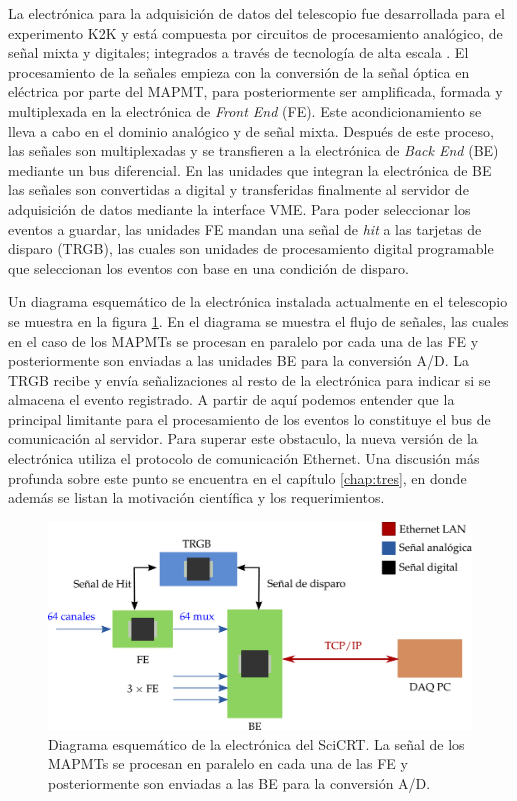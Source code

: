 La electrónica para la adquisición de datos del telescopio fue desarrollada para el experimento K2K y está compuesta por circuitos de procesamiento analógico, de señal mixta y digitales; integrados a través de tecnología de alta escala \cite{myoshi04}. El procesamiento de la señales empieza con la conversión de la señal óptica en eléctrica por parte del MAPMT, para posteriormente ser amplificada, formada y multiplexada en la electrónica de \emph{Front End} (FE). Este acondicionamiento se lleva a cabo en el dominio analógico y de señal mixta. Después de este proceso, las señales son multiplexadas y se transfieren a la electrónica de \emph{Back End} (BE) mediante un bus diferencial. En las unidades que integran la electrónica de BE las señales son convertidas a digital y transferidas finalmente al servidor de adquisición de datos mediante la interface VME. Para poder seleccionar los eventos a guardar, las unidades FE mandan una señal de \emph{hit} a las tarjetas de disparo (TRGB), las cuales son unidades de procesamiento digital programable que seleccionan los eventos con base en una condición de disparo.

Un diagrama esquemático de la electrónica instalada actualmente en el telescopio se muestra en la figura \ref{fig:scibar-electronics}. En el diagrama se muestra el flujo de señales, las cuales en el caso de los MAPMTs se procesan en paralelo por cada una de las FE y posteriormente son enviadas a las unidades BE para la conversión A/D. La TRGB recibe y envía señalizaciones al resto de la electrónica para indicar si se almacena el evento registrado. A partir de aquí podemos entender que la principal limitante  para el procesamiento de los eventos lo constituye el bus de comunicación al servidor. Para superar este obstaculo, la nueva versión de la electrónica utiliza el protocolo de comunicación Ethernet. Una discusión más profunda sobre este punto se encuentra en el capítulo \ref{chap:tres}, en donde además se listan la motivación científica y los requerimientos.

\begin{figure}
        \centering
        \includegraphics[width=\textwidth]{scicrt-electronics.pdf}
        \caption{Diagrama esquemático de la electrónica del SciCRT. La señal de los MAPMTs se procesan en paralelo en cada una de las FE y posteriormente son enviadas a las BE para la conversión A/D.}
        \label{fig:scibar-electronics}
\end{figure}

